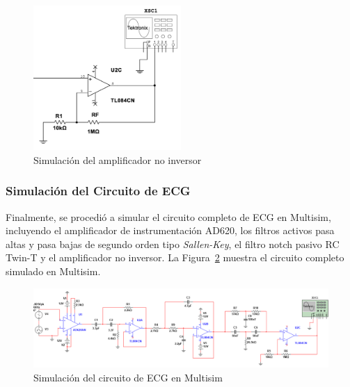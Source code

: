         \begin{figure}[H]
            \centering
            \includegraphics[width=0.5\textwidth]{img/Desarrollo/multisim_AmpNoInversor.png}
            \caption[Simulación del amplificador no inversor.]{Simulación del amplificador no inversor\footnotemark}
            \label{fig:Simulacion_Amplificador_No_Inversor}
        \end{figure}

        \subsubsection{Simulación del Circuito de ECG}

        Finalmente, se procedió a simular el circuito completo de ECG en Multisim, incluyendo el amplificador de instrumentación AD620, los filtros activos pasa altas y pasa bajas de segundo orden tipo \textit{Sallen-Key}, el filtro notch pasivo RC Twin-T y el amplificador no inversor. La Figura~\ref{fig:Simulacion_circuito_ECG} muestra el circuito completo simulado en Multisim.

        \begin{figure}[H]
            \centering
            \includegraphics[width=1.0\textwidth]{img/Desarrollo/multisim_circuito.png}
            \caption[Simulación del circuito de ECG en Multisim.]{Simulación del circuito de ECG en Multisim\footnotemark}
            \label{fig:Simulacion_circuito_ECG}
        \end{figure}

